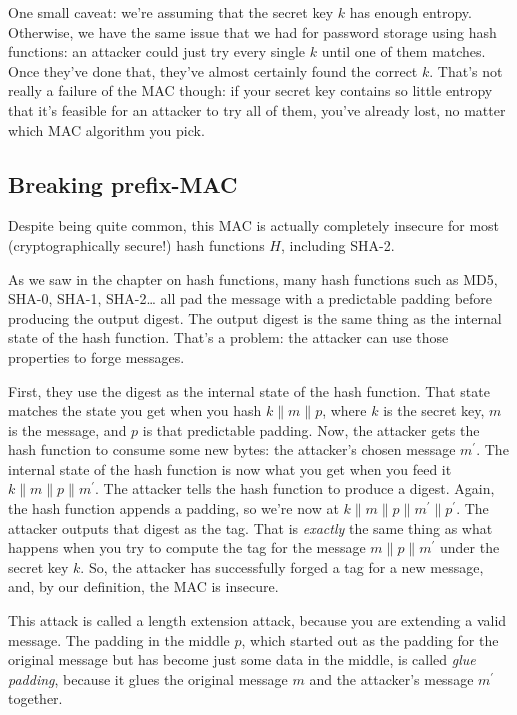 \documentclass[11pt,ebook,table,dvipsnames]{memoir}
\begin{document}
One small caveat: we're assuming that the secret key $k$ has enough
entropy. Otherwise, we have the same issue that we had for password
storage using hash functions: an attacker could just try every single
$k$ until one of them matches. Once they've done that, they've almost
certainly found the correct $k$. That's not really a failure of the
MAC though: if your secret key contains so little entropy that it's
feasible for an attacker to try all of them, you've already lost, no
matter which MAC algorithm you pick.

\subsection{Breaking prefix-MAC}
\label{sec-2-7-3-1}

Despite being quite common, this MAC is actually completely insecure
for most (cryptographically secure!) hash functions $H$, including
SHA-2.

As we saw in the chapter on hash functions, many hash functions such
as MD5, SHA-0, SHA-1, SHA-2\ldots{} all pad the message with a predictable
padding before producing the output digest. The output digest is the
same thing as the internal state of the hash function. That's a
problem: the attacker can use those properties to forge messages.

First, they use the digest as the internal state of the hash function.
That state matches the state you get when you hash $k \| m \| p$,
where $k$ is the secret key, $m$ is the message, and $p$ is that
predictable padding. Now, the attacker gets the hash function to
consume some new bytes: the attacker's chosen message $m^{\prime}$.
The internal state of the hash function is now what you get when you
feed it $k \| m \| p \| m^{\prime}$. The attacker tells the hash
function to produce a digest. Again, the hash function appends a
padding, so we're now at $k \| m \| p \| m^{\prime} \| p^{\prime}$.
The attacker outputs that digest as the tag. That is \emph{exactly} the
same thing as what happens when you try to compute the tag for the
message $m \| p \| m^{\prime}$ under the secret key $k$. So, the
attacker has successfully forged a tag for a new message, and, by our
definition, the MAC is insecure.

This attack is called a length extension attack, because you are
extending a valid message. The padding in the middle $p$, which
started out as the padding for the original message but has become
just some data in the middle, is called \emph{glue padding}, because it
glues the original message $m$ and the attacker's message $m^{\prime}$
together.
\end{document}
